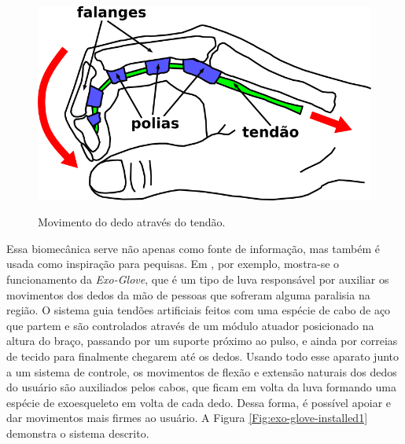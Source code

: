 \documentclass[
	12pt,				%
	openright,			%
	oneside,			%
	a4paper,			%
	english,			%
	brazil				%
	]{abntex2}
\begin{document}
		\begin{figure}[h!]
			\centering
  		\caption{Movimento do dedo através do tendão.}
  		\includegraphics[scale=0.5]{./figures/hand-tendon-flex1.png}
  		\label{Fig:hand-tendon-flex1}
		\end{figure}

		Essa biomecânica serve não apenas como fonte de informação, mas também é usada como inspiração para pequisas. Em \cite{hyunki2015exoglove}, por exemplo, mostra-se o funcionamento da \textit{Exo-Glove}, que é um tipo de luva responsável por auxiliar os movimentos dos dedos da mão de pessoas que sofreram alguma paralisia na região. O sistema guia tendões artificiais feitos com uma espécie de cabo de aço que partem e são controlados através de um módulo atuador posicionado na altura do braço, passando por um suporte próximo ao pulso, e ainda por correias de tecido para finalmente chegarem até os dedos. Usando todo esse aparato junto a um sistema de controle, os movimentos de flexão e extensão naturais dos dedos do usuário são auxiliados pelos cabos, que ficam em volta da luva formando uma espécie de exoesqueleto em volta de cada dedo. Dessa forma, é possível apoiar e dar movimentos mais firmes ao usuário. A Figura \ref{Fig:exo-glove-installed1} demonstra o sistema descrito.
\end{document}
